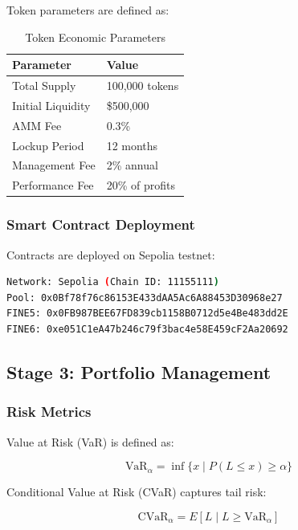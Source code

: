 ﻿\documentclass[12pt]{article}
\begin{document}
Token parameters are defined as:

\begin{table}[H]
\centering
\caption{Token Economic Parameters}
\label{tab:token}
\begin{tabular}{@{}ll@{}}
\toprule
\textbf{Parameter} & \textbf{Value} \\
\midrule
Total Supply & 100,000 tokens \\
Initial Liquidity & \$500,000 \\
AMM Fee & 0.3\% \\
Lockup Period & 12 months \\
Management Fee & 2\% annual \\
Performance Fee & 20\% of profits \\
\bottomrule
\end{tabular}
\end{table}

\subsubsection{Smart Contract Deployment}

Contracts are deployed on Sepolia testnet:

\begin{lstlisting}[language=bash, caption=Deployed Contract Addresses]
Network: Sepolia (Chain ID: 11155111)
Pool: 0x0Bf78f76c86153E433dAA5Ac6A88453D30968e27
FINE5: 0x0FB987BEE67FD839cb1158B0712d5e4Be483dd2E
FINE6: 0xe051C1eA47b246c79f3bac4e58E459cF2Aa20692
\end{lstlisting}

\subsection{Stage 3: Portfolio Management}

\subsubsection{Risk Metrics}

Value at Risk (VaR) is defined as:

\begin{equation}
\text{VaR}_\alpha = \inf\{x \mid P(L \leq x) \geq \alpha\}
\label{eq:var}
\end{equation}

Conditional Value at Risk (CVaR) captures tail risk:

\begin{equation}
\text{CVaR}_\alpha = E[L \mid L \geq \text{VaR}_\alpha]
\label{eq:cvar}
\end{equation}
\end{document}
